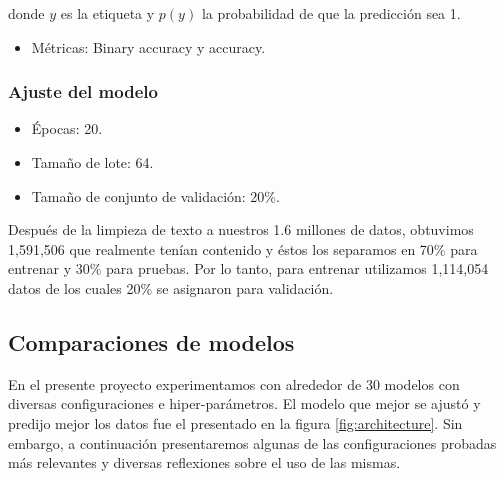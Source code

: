 \documentclass[sigconf, nonacm, spanish]{acmart}
\begin{document}
donde $y$ es la etiqueta y $p(y)$ la probabilidad de que la predicción sea 1.

\begin{itemize}
    \item Métricas: Binary accuracy y accuracy.
\end{itemize}


\subsubsection{Ajuste del modelo}
\begin{itemize}
    \item Épocas: 20.
    \item Tamaño de lote: 64.
    \item Tamaño de conjunto de validación: 20\%.
\end{itemize}

Después de la limpieza de texto a nuestros 1.6 millones de datos, obtuvimos 1,591,506 que realmente tenían contenido y éstos los separamos en 70\% para entrenar y 30\% para pruebas. Por lo tanto, para entrenar utilizamos 1,114,054 datos de los cuales 20\% se asignaron para validación.

\subsection{Comparaciones de modelos}

En el presente proyecto experimentamos con alrededor de 30 modelos con diversas configuraciones e hiper-parámetros. El modelo que mejor se ajustó y predijo mejor los datos fue el presentado en la figura \ref{fig:architecture}. Sin embargo, a continuación presentaremos algunas de las configuraciones probadas más relevantes y diversas reflexiones sobre el uso de las mismas. 
\end{document}
